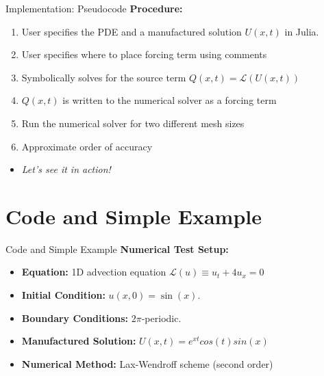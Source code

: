 \documentclass{beamer}
\begin{document}
\begin{frame}{Implementation: Pseudocode}
    \textbf{Procedure:}
    \begin{enumerate}
        \item User specifies the PDE and a manufactured solution \( U(x,t) \) in Julia.
        \item User specifies where to place forcing term using comments
        \item Symbolically solves for the source term \( Q(x,t) = \mathcal{L}(U(x,t)) \)
        \item \( Q(x,t) \) is written to the numerical solver as a forcing term
        \item Run the numerical solver for two different mesh sizes
        \item Approximate order of accuracy
    \end{enumerate}
    \vspace{0.5cm}
    \begin{itemize}
        \item \textit{Let's see it in action!}
    \end{itemize}
\end{frame}


\section{Code and Simple Example}

\begin{frame}{Code and Simple Example}
    \textbf{Numerical Test Setup:}
    \begin{itemize}
        \item \textbf{Equation:} 1D advection equation $\mathcal{L}(u) \equiv u_t + 4 u_x = 0$
        \item \textbf{Initial Condition:} $u(x,0) = \sin(x)$.
        \item \textbf{Boundary Conditions:} $2\pi$-periodic.
        \item \textbf{Manufactured Solution:} $U(x,t) = e^{xt}cos(t)sin(x)$
        \item \textbf{Numerical Method:} Lax-Wendroff scheme (second order) 
    \end{itemize}
\end{frame}
\end{document}
